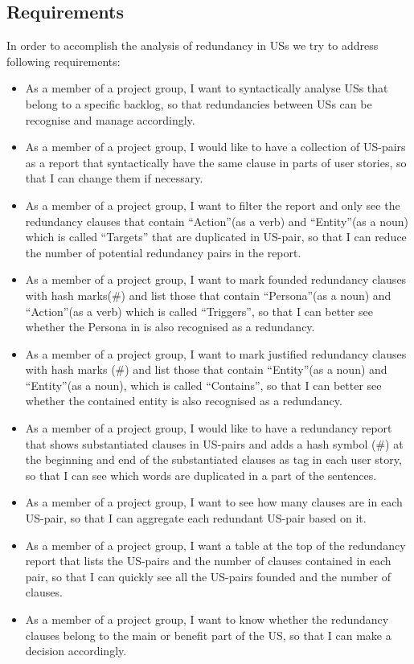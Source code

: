 \subsection{Requirements}\label{redundancy_requirement}
In order to accomplish the analysis of redundancy in USs we try to address following requirements:
\begin{itemize}
\item As a member of a project group, I want to syntactically analyse USs that belong to a specific backlog, so that redundancies between USs can be recognise and manage accordingly.
\item As a member of a project group, I would like to have a collection of US-pairs as a report that syntactically have the same clause in parts of user stories, so that I can change them if necessary.
\item As a member of a project group, I want to filter the report and only see the redundancy clauses that contain \enquote{Action}(as a verb) and \enquote{Entity}(as a noun) which is called \enquote{Targets} that are duplicated in US-pair, so that I can reduce the number of potential redundancy pairs in the report.
\item As a member of a project group, I want to mark founded redundancy clauses with hash marks(\#) and list those that contain \enquote{Persona}(as a noun) and \enquote{Action}(as a verb) which is called \enquote{Triggers}, so that I can better see whether the Persona in is also recognised as a redundancy.
\item As a member of a project group, I want to mark justified redundancy clauses with hash marks (\#) and list those that contain \enquote{Entity}(as a noun) and \enquote{Entity}(as a noun), which is called \enquote{Contains}, so that I can better see whether the contained entity is also recognised as a redundancy.
\item As a member of a project group, I would like to have a redundancy report that shows substantiated clauses in US-pairs and adds a hash symbol (\#) at the beginning and end of the substantiated clauses as tag in each user story, so that I can see which words are duplicated in a part of the sentences.
\item As a member of a project group, I want to see how many clauses are in each US-pair, so that I can aggregate each redundant US-pair based on it.
\item As a member of a project group, I want a table at the top of the redundancy report that lists the US-pairs and the number of clauses contained in each pair, so that I can quickly see all the US-pairs founded and the number of clauses. 
\item As a member of a project group, I want to know whether the redundancy clauses belong to the main or benefit part of the US, so that I can make a decision accordingly.

\end{itemize}

